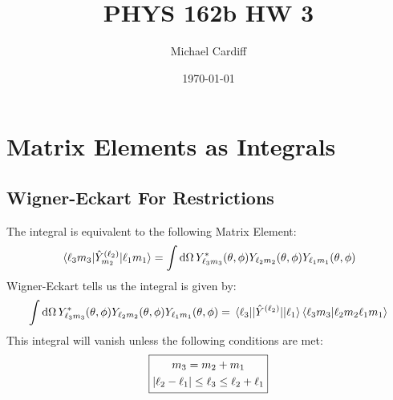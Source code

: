 \documentclass[12pt]{article}
\title{\vspace{-3em}PHYS 162b HW 3}
\author{Michael Cardiff}
\date{\today}
\renewcommand{\l}{\ell}
\begin{document}
\maketitle
\section{Matrix Elements as Integrals}

\subsection{Wigner-Eckart For Restrictions}
The integral is equivalent to the following Matrix Element:
\begin{align*}
  \mel{\l_3m_3}{\hat{Y}^{(\l_2)}_{m_2}}{\l_1m_1}=
  \int\dd{\Omega}Y^*_{\l_3m_3}(\theta,\phi)
  Y_{\l_2m_2}(\theta,\phi)Y_{\l_1m_1}(\theta,\phi)
\end{align*}
Wigner-Eckart tells us the integral is given by:
\begin{align*}
  \int\dd{\Omega}Y^*_{\l_3m_3}(\theta,\phi)
  Y_{\l_2m_2}(\theta,\phi)Y_{\l_1m_1}(\theta,\phi)
  =\mel{\l_3}{|\hat{Y}^{(\l_2)}|}{\l_1}\ip{\l_3m_3}{\l_2m_2\l_1m_1}
\end{align*}
This integral will vanish unless the following conditions are met:
\begin{equation}
  \boxed{
    \begin{gathered}
      m_3=m_2+m_1\\
      \abs{\l_2-\l_1}\leq\l_3\leq\l_2+\l_1
    \end{gathered}
  }
\end{equation}
\end{document}
